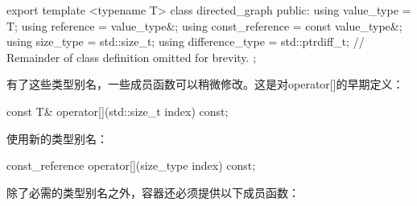 \begin{cpp}
export template <typename T>
class directed_graph
{
    public:
        using value_type = T;
        using reference = value_type&;
        using const_reference = const value_type&;
        using size_type = std::size_t;
        using difference_type = std::ptrdiff_t;
        // Remainder of class definition omitted for brevity.
};
\end{cpp}

有了这些类型别名，一些成员函数可以稍微修改。这是对operator[]的早期定义：

\begin{cpp}
const T& operator[](std::size_t index) const;
\end{cpp}

使用新的类型别名：

\begin{cpp}
const_reference operator[](size_type index) const;
\end{cpp}


除了必需的类型别名之外，容器还必须提供以下成员函数：

